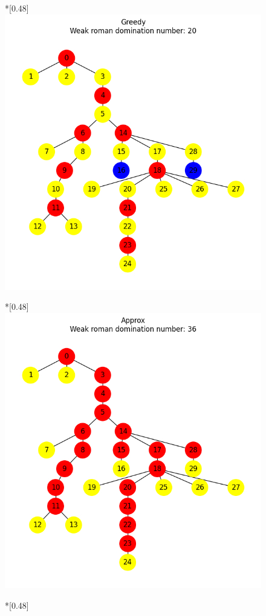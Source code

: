 \begin{figure}[htbp]
        \begin{subcaptionbox}*{}[0.48\linewidth]
            {\includegraphics[width=0.75\linewidth]{assets/plots/Greedy/RandomTree_n30_i2_results.png}}
        \end{subcaptionbox}
        \hfill
        \begin{subcaptionbox}*{}[0.48\linewidth]
            {\includegraphics[width=0.75\linewidth]{assets/plots/Approx/RandomTree_n30_i2_results.png}}
        \end{subcaptionbox}
        \hfill
        \begin{subcaptionbox}*{}[0.48\linewidth]

\end{subcaptionbox}
\end{figure}
